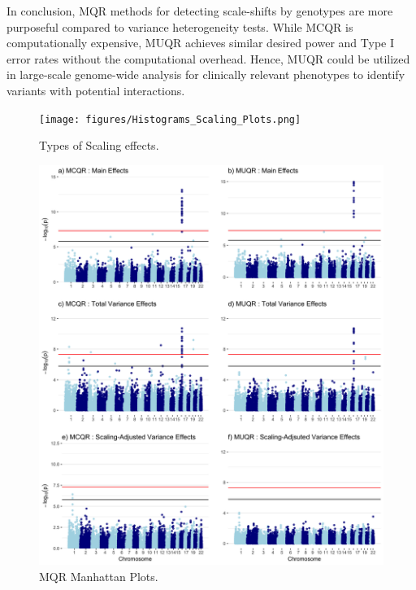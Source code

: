 \documentclass[12pt]{article}
\begin{document}
In conclusion, MQR methods for detecting scale-shifts by genotypes are more purposeful compared to variance heterogeneity tests. While MCQR is computationally expensive, MUQR achieves similar desired power and Type I error rates without the computational overhead. Hence, MUQR could be utilized in large-scale genome-wide analysis for clinically relevant phenotypes to identify variants with potential interactions. 

\newpage
\begin{figure} 
	\centering
	\texttt{[image: figures/Histograms\_Scaling\_Plots.png]}
	\caption{Types of Scaling effects.}
	\label{fig:ScaleEffTypes}
\end{figure}

\newpage
	\begin{figure} 
	\centering
	\includegraphics[width=1 \textwidth, height=1.2\textwidth]{figures/MQR_Manhattan_Plots.png}
	\caption{MQR Manhattan Plots.}
	\label{fig:ManhattanPlots}
\end{figure}
\end{document}
